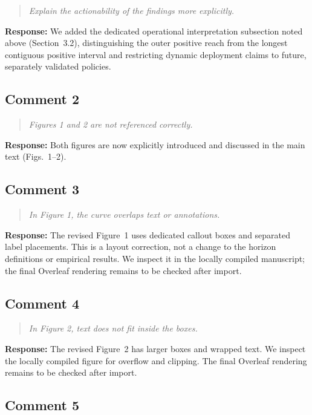 \documentclass[11pt,a4paper]{article}
\let\originalsubsection\subsection
\renewcommand{\subsection}{\Needspace{9\baselineskip}\originalsubsection}
\newenvironment{reviewcomment}
  {\begin{quote}\itshape}
  {\end{quote}}
\newcommand{\response}{\noindent\textbf{Response:} }
\begin{document}
\begin{reviewcomment}
Explain the actionability of the findings more explicitly.
\end{reviewcomment}

\response
We added the dedicated operational interpretation subsection noted above
(Section~3.2), distinguishing the outer positive reach from the longest
contiguous positive interval and restricting dynamic deployment claims to
future, separately validated policies.


\subsection*{Comment 2}

\begin{reviewcomment}
Figures 1 and 2 are not referenced correctly.
\end{reviewcomment}

\response
Both figures are now explicitly introduced and discussed in the main text
(Figs.~1--2).


\subsection*{Comment 3}

\begin{reviewcomment}
In Figure 1, the curve overlaps text or annotations.
\end{reviewcomment}

\response
The revised Figure~1 uses dedicated callout boxes and separated label
placements. This is a layout correction, not a change to the horizon
definitions or empirical results. We inspect it in the locally compiled
manuscript; the final Overleaf rendering remains to be checked after import.


\subsection*{Comment 4}

\begin{reviewcomment}
In Figure 2, text does not fit inside the boxes.
\end{reviewcomment}

\response
The revised Figure~2 has larger boxes and wrapped text. We inspect the
locally compiled figure for overflow and clipping. The final Overleaf
rendering remains to be checked after import.


\subsection*{Comment 5}
\end{document}

